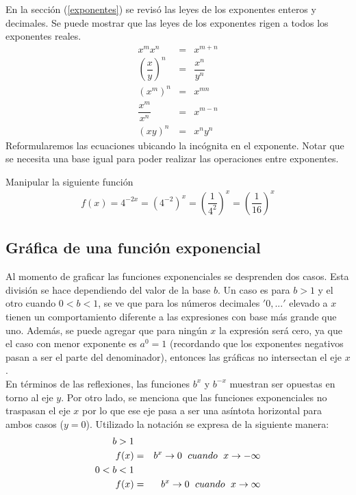 En la sección (\ref{exponentes}) se revisó las leyes de los exponentes enteros y decimales. Se puede mostrar que las leyes de los exponentes rigen a todos los exponentes reales. 
\begin{eqnarray}
x^{m}x^{n}&=&x^{m+n}\\
\left(\dfrac{x}{y}\right)^{n}&=&\dfrac{x^{n}}{y^{n}}\\
(x^{m})^{n}&=&x^{mn}\\
\dfrac{x^{m}}{x^{n}}&=&x^{m-n}\\
(xy)^{n}&=&x^{n}y^{n}
\end{eqnarray}
Reformularemos las ecuaciones ubicando la incógnita en el exponente. Notar que se necesita una base igual para poder realizar las operaciones entre exponentes. 

\begin{myexample}
Manipular la siguiente función
\begin{eqnarray}
f(x)=4^{-2x}=(4^{-2})^{x}=\left(\dfrac{1}{4^{2}} \right)^{x}=\left(\dfrac{1}{16} \right)^{x}
\end{eqnarray}
\end{myexample}

\subsection{Gráfica de una función exponencial}
Al momento de graficar las funciones exponenciales se desprenden dos casos. Esta división se hace dependiendo del valor de la base $b$. Un caso es para $b>1$ y el otro cuando $0<b<1$, se ve que para los números decimales $'0,...'$ elevado a $x$ tienen un comportamiento diferente a las expresiones con base más grande que uno. Además, se puede agregar que para ningún $x$ la expresión será cero, ya que el caso con menor exponente es $a^{0}=1$ (recordando que los exponentes negativos pasan a ser el parte del denominador), entonces las gráficas no intersectan el eje $x$.\\

En términos de las reflexiones, las funciones $b^{x}$ y $b^{-x}$ muestran ser opuestas en torno al eje $y$. Por otro lado, se menciona que las funciones exponenciales no traspasan el eje $x$ por lo que ese eje pasa a ser una asíntota horizontal para ambos casos ($y=0$). Utilizado la notación se expresa de la siguiente manera:
\begin{eqnarray}
b  > 1\nonumber\\
f(x)&=& b^{x}\rightarrow 0 \hspace{6px} cuando \hspace{6px} x\rightarrow -\infty\\
0< b  <1\nonumber\\
f(x)&=& b^{x}\rightarrow 0 \hspace{6px} cuando \hspace{6px} x\rightarrow \infty
\end{eqnarray}

